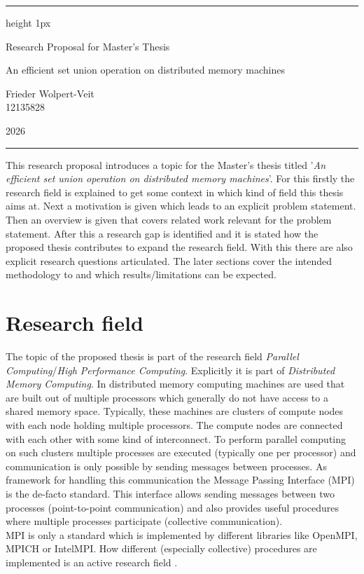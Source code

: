 \documentclass[a4paper,%
	12pt,%
	DIV14,
	headsepline,%
	headings=normal,
]{scrartcl}
\theoremstyle{definition}
\theoremstyle{remark}
\begin{document}
\hrule height 1px
\vspace*{2ex}

\begin{center}
	{\Huge Research Proposal for Master's Thesis}\\
	\vspace{2mm}
	
	{\large An efficient set union operation on distributed memory machines} \\
	\vspace{10mm}
		
	{\Large Frieder Wolpert-Veit} \\
	{12135828}\\
	\vspace{6mm}
	
	{\Large 2026} \\
	\hspace{3mm}
\end{center}
\hfill

\hrule 
\vspace{4mm}

This research proposal introduces a topic for the Master's thesis titled '\emph{An efficient set union operation on distributed memory machines}'. For this firstly the research field is explained to get some context in which kind of field this thesis aims at. Next a motivation is given which leads to an explicit problem statement. Then an overview is given that covers related work relevant for the problem statement. After this a research gap is identified and it is stated how the proposed thesis contributes to expand the research field. With this there are also explicit research questions articulated. The later sections cover the intended methodology to and which results/limitations can be expected.

\section{Research field}
The topic of the proposed thesis is part of the research field \emph{Parallel Computing}/\emph{High Performance Computing}. Explicitly it is part of \emph{Distributed Memory Computing}. In distributed memory computing machines are used that are built out of multiple processors which generally do not have access to a shared memory space. Typically, these machines are clusters of compute nodes with each node  holding multiple processors. The compute nodes are connected with each other with some kind of interconnect. To perform parallel computing on such clusters multiple processes are executed (typically one per processor) and communication is only possible by sending messages between processes. As framework for handling this communication the Message Passing Interface (MPI) \cite{mpi} is the de-facto standard. This interface allows sending messages between two processes (point-to-point communication) and also provides useful procedures where multiple processes participate (collective communication). \cite{lecturesTräff, modelDistributedMemory}\\
MPI is only a standard which is implemented by different libraries like OpenMPI, MPICH or IntelMPI. How different (especially collective) procedures are implemented is an active research field \cite{traeff2025}.
\end{document}
